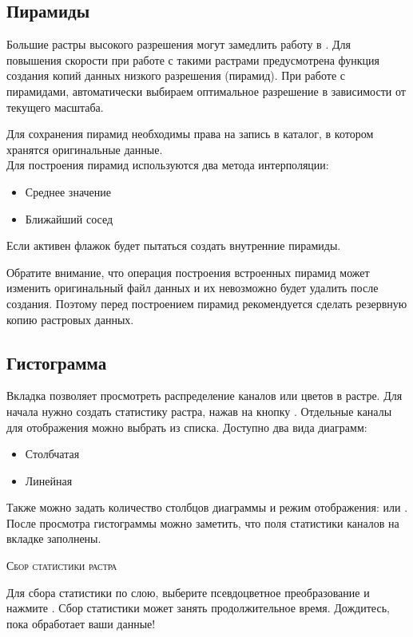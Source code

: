 \subsection{Пирамиды}\label{raster_pyramids}

Большие растры высокого разрешения могут замедлить работу в \qg. Для повышения
скорости при работе с такими растрами предусмотрена функция создания
копий данных низкого разрешения (пирамид). При работе с пирамидами, \qg
автоматически выбираем оптимальное разрешение в зависимости от текущего масштаба.

Для сохранения пирамид необходимы права на запись в каталог, в котором
хранятся оригинальные данные. \\
Для построения пирамид используются два метода интерполяции:
\begin{itemize}[label=--]
\item Среднее значение
\item Ближайший сосед
\end{itemize}

Если активен флажок
 \qg будет
пытаться создать внутренние пирамиды.

Обратите внимание, что операция построения встроенных пирамид может
изменить оригинальный файл данных и их невозможно будет удалить после
создания. Поэтому перед построением пирамид рекомендуется сделать резервную копию
растровых данных.

\subsection{Гистограмма}\label{label_histogram}

Вкладка  позволяет просмотреть распределение 
каналов или цветов в растре. Для начала нужно создать статистику растра,
нажав на кнопку . Отдельные каналы для
отображения можно выбрать из списка. Доступно два вида диаграмм:

\begin{itemize}[label=--]
\item Столбчатая
\item Линейная
\end{itemize}

Также можно задать количество столбцов диаграммы и режим отображения:
 или .
После просмотра гистограммы можно заметить, что поля статистики каналов
на вкладке  заполнены.

\begin{Tip}\caption{\textsc{Сбор статистики растра}}
Для сбора статистики по слою, выберите псевдоцветное преобразование и
нажмите . Сбор статистики может занять продолжительное
время. Дождитесь, пока \qg обработает ваши данные!
\end{Tip}

\FloatBarrier
